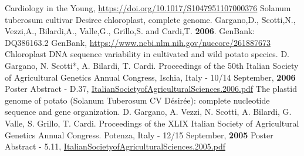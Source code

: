 \documentclass[8pt]{stackoverflow-upgraded-version} %
\begin{document}
\begin{publicationlist}
		{Cardiology in the Young, \href{https://doi.org/10.1017/S1047951107000376}{https://doi.org/10.1017/S1047951107000376}}
	\publication
		{Solanum tuberosum cultivar Desiree chloroplast, complete genome.}
		{Gargano,D., Scotti,N., Vezzi,A., Bilardi,A., Valle,G., Grillo,S. and Cardi,T. \textbf{2006}. GenBank: DQ386163.2}
		{GenBank, \href{https://www.ncbi.nlm.nih.gov/nuccore/261887673}{https://www.ncbi.nlm.nih.gov/nuccore/261887673}}
	\publication
		{Chloroplast DNA sequence variability in cultivated and wild potato species.}
		{D. Gargano, N. Scotti*, A. Bilardi, T. Cardi. Proceedings of the 50th Italian Society of Agricultural Genetics Annual Congress, Ischia, Italy - 10/14 September, \textbf{2006}}
		{Poster Abstract - D.37, \href{https://s3-eu-west-1.amazonaws.com/cdn.bilardi.net/resume/publications/ItalianSocietyofAgriculturalSciences.2006.pdf}{ItalianSocietyofAgriculturalSciences.2006.pdf}}
	\publication
		{The plastid genome of potato (Solanum Tuberosum CV Désirée): complete nucleotide sequence and gene organization.}
		{D. Gargano, A. Vezzi, N. Scotti, A. Bilardi, G. Valle, S. Grillo, T. Cardi. Proceedings of the XLIX Italian Society of Agricultural Genetics Annual Congress. Potenza, Italy - 12/15 September, \textbf{2005}}
		{Poster Abstract - 5.11, \href{https://s3-eu-west-1.amazonaws.com/cdn.bilardi.net/resume/publications/ItalianSocietyofAgriculturalSciences.2005.pdf}{ItalianSocietyofAgriculturalSciences.2005.pdf}}
\end{publicationlist}
\end{document}
